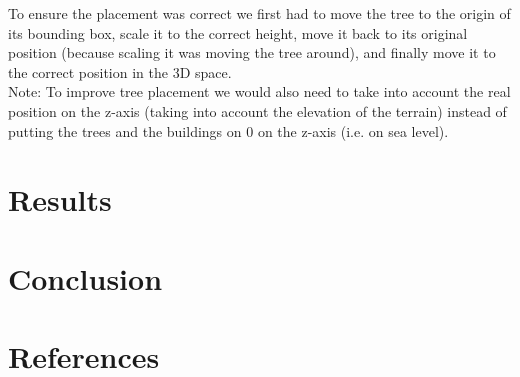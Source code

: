 \documentclass[12pt]{article}
\begin{document}
To ensure the placement was correct we first had to move the tree to the origin
of its bounding box, scale it to the correct height, move it back to its original position
(because scaling it was moving the tree around), and finally move it to the correct position in the 3D space. \\

Note: To improve tree placement we would also need to take into account the real
position on the z-axis (taking into account the elevation of the terrain) instead
of putting the trees and the buildings on 0 on the z-axis (i.e. on sea level).


\section{Results}


\newpage

\section{Conclusion}


\newpage

\section{References}


\end{document}
